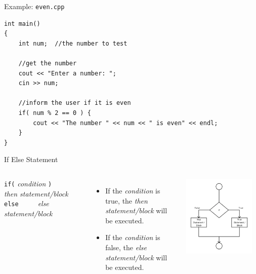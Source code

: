 \documentclass[]{beamer}
\begin{document}
\begin{frame}[fragile]{Example: \texttt{even.cpp}}
\begin{adjustbox}{max height=0.9\textheight, max width=0.95\textwidth}
\begin{BVerbatim}
int main()
{
    int num;  //the number to test

    //get the number
    cout << "Enter a number: ";
    cin >> num;

    //inform the user if it is even
    if( num % 2 == 0 ) {
        cout << "The number " << num << " is even" << endl;
    }
}
\end{BVerbatim}
\end{adjustbox}
\end{frame}

\begin{frame}[fragile]{If Else Statement}
\begin{columns}
    \verb!if(! \textit{condition} \verb!)! 
    \newline\verb!    ! \textit{then statement/block}
    \newline\verb!else!
    \newline\verb!    ! \textit{else statement/block}

    \vspace{1cm}

    \begin{itemize}[<+(1)->]
        \item If the \textit{condition} is true, the
            \textit{then statement/block} will be executed.
        \item If the \textit{condition} is false, the 
            \textit{else statement/block} will be executed.
    \end{itemize}

    \includegraphics[width=0.9\textwidth]{images/if-else}
\end{columns}
\end{frame}
\end{document}
